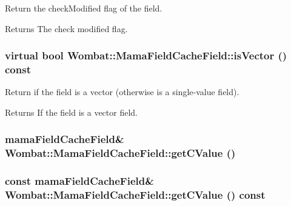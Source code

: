 Return the checkModified flag of the field. \begin{DoxyReturn}{Returns}
The check modified flag. 
\end{DoxyReturn}
\hypertarget{classWombat_1_1MamaFieldCacheField_aea1bb4b00b1105a05bbda687124da5e3}{
\subsubsection[{isVector}]{\setlength{\rightskip}{0pt plus 5cm}virtual bool Wombat::MamaFieldCacheField::isVector () const}}
\label{classWombat_1_1MamaFieldCacheField_aea1bb4b00b1105a05bbda687124da5e3}


Return if the field is a vector (otherwise is a single-\/value field). \begin{DoxyReturn}{Returns}
If the field is a vector field. 
\end{DoxyReturn}
\hypertarget{classWombat_1_1MamaFieldCacheField_aba5fc4029c002c24f0a47b7a46755752}{
\subsubsection[{getCValue}]{\setlength{\rightskip}{0pt plus 5cm}mamaFieldCacheField\& Wombat::MamaFieldCacheField::getCValue ()}}
\label{classWombat_1_1MamaFieldCacheField_aba5fc4029c002c24f0a47b7a46755752}
\hypertarget{classWombat_1_1MamaFieldCacheField_ae778bb36d98a120965787d59b71b806c}{
\subsubsection[{getCValue}]{\setlength{\rightskip}{0pt plus 5cm}const mamaFieldCacheField\& Wombat::MamaFieldCacheField::getCValue () const}}
\label{classWombat_1_1MamaFieldCacheField_ae778bb36d98a120965787d59b71b806c}
